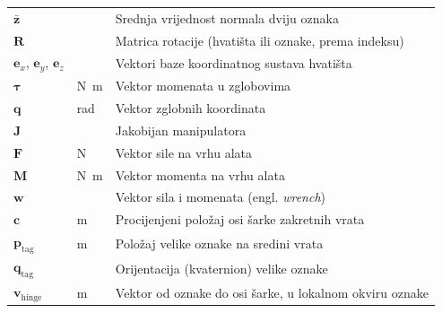 \begin{longtable}{@{}p{}p{}p{}@{}}
    $\bar{\bm{z}}$                     &                                  & Srednja vrijednost normala dviju oznaka                                                         \\
    $\bm{R}$                           &                                  & Matrica rotacije (hvatišta ili oznake, prema indeksu)                                           \\
    $\bm{e}_x$, $\bm{e}_y$, $\bm{e}_z$ &                                  & Vektori baze koordinatnog sustava hvatišta                                                      \\
    $\bm{\tau}$                        & \si{\newton\metre}               & Vektor momenata u zglobovima                                                                    \\
    $\bm{q}$                           & \si{\radian}                     & Vektor zglobnih koordinata                                                                      \\
    $\bm{J}$                           &                                  & Jakobijan manipulatora                                                                          \\
    $\bm{F}$                           & \si{\newton}                     & Vektor sile na vrhu alata                                                                       \\
    $\bm{M}$                           & \si{\newton\metre}               & Vektor momenta na vrhu alata                                                                    \\
    $\bm{w}$                           &                                  & Vektor sila i momenata (engl. \textit{wrench})                                                  \\
    $\bm{c}$                           & m                                & Procijenjeni položaj osi šarke zakretnih vrata                                                  \\
    $\bm{p}_{\mathrm{tag}}$            & m                                & Položaj velike oznake na sredini vrata                                                          \\
    $\bm{q}_{\mathrm{tag}}$            &                                  & Orijentacija (kvaternion) velike oznake                                                         \\
    $\bm{v}_{\mathrm{hinge}}$          & m                                & Vektor od oznake do osi šarke, u lokalnom okviru oznake                                         \\

\end{longtable}
